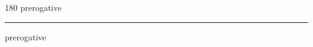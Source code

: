 
\begin{frame}
\begin{center}
\begin{turn}{180}
{\fontsize{2.5cm}{1em}\selectfont prerogative}
\end{turn}
\vspace{1em}\par  
\hrule
\vspace{1em}\par  
{\fontsize{2.5cm}{1em}\selectfont prerogative}
\end{center}
\end{frame}
